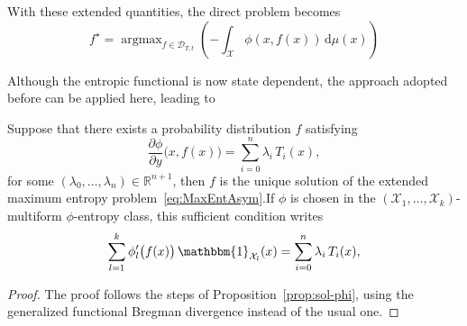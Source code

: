 \documentclass[entropy,article,submit,moreauthors,pdftex]{Definitions/mdpi}
\def\dmu{\mathrm{d}\mu}%
\def\Rset{\mathbb{R}}%
\def\X{\mathcal{X}}%
\def\D{\mathcal{D}}%
\def\un{\mathbbm{1}}%
\DeclareMathOperator*{\argmax}{\operatorname{argmax}}%
\begin{document}
With these extended quantities, the direct problem becomes
%
\begin{equation}\label{eq:MaxEntAsym}
f^\star  = \argmax_{f  \in \D_{T,t}}  \left( -  \int_\X \phi(x,f(x))  \, \dmu(x)
\right)
\end{equation}

Although the  entropic functional is  now state dependent, the  approach adopted
before can be applied here, leading to

\begin{Proposition}
\label{prop:sol-asym_phi}
%
  Suppose that there exists a probability distribution $f$ satisfying
  \begin{equation}\label{eq:sol-asym_phi}
  \frac{\partial \phi}{\partial y}\big(x,f(x)\big) = \sum_{i=0}^n \lambda_i \,
  T_i(x),
  \end{equation}
  for  some  $(\lambda_0,\ldots,\lambda_n) \in  \Rset^{n+1}$,  then  $f$ is  the
  unique      solution      of       the      extended      maximum      entropy
  problem~\eqref{eq:MaxEntAsym}.\newline  If $\phi$  is chosen  in the  $(\X_1 ,
  \ldots  , \X_k)$-multiform  $\phi$-entropy  class,  this sufficient  condition
  writes
  \begin{equation}\label{eq:sol-multiform_phi}
  \sum_{l=1}^k \phi_l'\big(f(x)\big)  \, \un_{\X_l}(x) =  \sum_{i=0}^n \lambda_i
  \, T_i(x),
  \end{equation}
\end{Proposition}
%
\begin{proof}
  The  proof  follows the  steps  of  Proposition~\ref{prop:sol-phi}, using  the
  generalized functional Bregman divergence instead of the usual one.
\end{proof}
\end{document}
